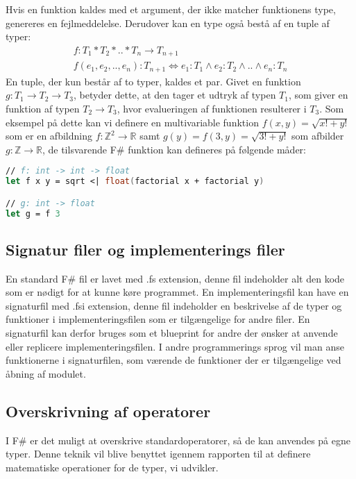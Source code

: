 Hvis en funktion kaldes med et argument, der ikke matcher funktionens type, genereres en fejlmeddelelse. Derudover kan en type også bestå af en tuple af typer:
\begin{gather*}
    f: T_1 * T_2 * .. * T_n \rightarrow T_{n+1}\\
    f (e_1, e_2, .., e_n) :T_{n+1} \iff e_1 : T_1 \land e_2 : T_2 \land .. \land e_n : T_n
\end{gather*}
En tuple, der kun består af to typer, kaldes et par. Givet en funktion $g: T_1 \rightarrow T_2 \rightarrow T_3$, betyder dette, at den tager et udtryk af typen $T_1$, som giver en funktion af typen $T_2 \rightarrow T_3$, hvor evalueringen af funktionen resulterer i $T_3$. Som eksempel på dette kan vi definere en multivariable funktion $f(x, y) = \sqrt{x! + y!}$ som er en afbildning $f: \mathbb{Z}^2 \to \mathbb{R}$ samt $g(y) = f(3, y) = \sqrt{3! + y!}$ som afbilder $g: \mathbb{Z} \to \mathbb{R}$, de tilsvarende F\# funktion kan defineres på følgende måder:
\begin{lstlisting}[language={FSharp}, label={lst:multivariable_function}, caption={Eksempel typerne for en multivariable funktion i F\#}]
// f: int -> int -> float
let f x y = sqrt <| float(factorial x + factorial y)

// g: int -> float
let g = f 3
\end{lstlisting}





\subsection{Signatur filer og implementerings filer}
En standard F\# fil er lavet med .fs extension, denne fil indeholder alt den kode som er nødigt for at kunne køre programmet. En implementeringsfil kan have en signaturfil med .fsi extension, denne fil indeholder en beskrivelse af de typer og funktioner i implementeringsfilen som er tilgængelige for andre filer. En signaturfil kan derfor bruges som et blueprint for andre der ønsker at anvende eller replicere implementeringsfilen. I andre programmerings sprog vil man anse funktionerne i signaturfilen, som værende de funktioner der er tilgængelige ved åbning af modulet.

\subsection{Overskrivning af operatorer}
I F\# er det muligt at overskrive standardoperatorer, så de kan anvendes på egne typer. Denne teknik vil blive benyttet igennem rapporten til at definere matematiske operationer for de typer, vi udvikler.

